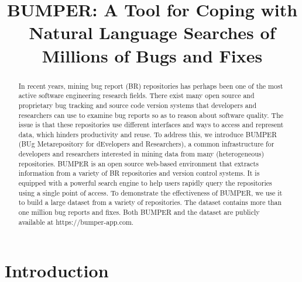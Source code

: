 \documentclass[conference]{IEEEtran}
\begin{document}
\title{BUMPER: A Tool for Coping with Natural Language Searches of Millions of Bugs and Fixes}


\author{
\and
{}
}

\maketitle

\begin{abstract}
In recent years, mining bug report (BR) repositories has perhaps been one of the most active software engineering research fields. There exist many open source and proprietary bug tracking and source code version systems that developers and researchers can use to examine bug reports so as to reason about software quality. The issue is that these repositories use different interfaces and ways to access and represent data, which hinders productivity and reuse. To address this, we introduce BUMPER (BUg Metarepository for dEvelopers and Researchers), a common infrastructure for developers and researchers interested in mining data from many (heterogeneous) repositories. BUMPER is an open source web-based environment that extracts information from a variety of BR repositories and version control systems. It is equipped with a powerful search engine to help users rapidly query the repositories using a single point of access. To demonstrate the effectiveness of BUMPER, we use it to build a large dataset from a variety of repositories. The dataset contains more than one million bug reports and fixes. Both BUMPER and the dataset are publicly available at https://bumper-app.com.

\end{abstract}


\IEEEpeerreviewmaketitle


\section{Introduction}
\end{document}
